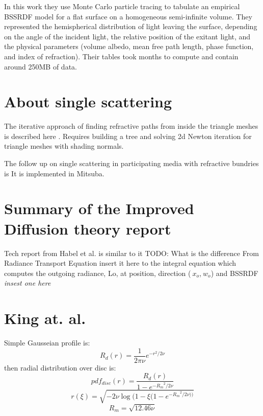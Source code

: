 In this work they use Monte Carlo particle tracing to tabulate an empirical
BSSRDF model for a flat surface on a homogeneous semi-infinite volume.
They represented the hemispherical distribution of light leaving the surface,
depending on the angle of the incident light, the relative position of the
exitant light, and the physical parameters (volume albedo, mean free path
length, phase function, and index of refraction). Their tables took months to
compute and contain around 250MB of data.

\section{About single scattering}
The iterative approach of finding refractive paths from inside the triangle
meshes is described here \cite{walter:inria-00388481}. Requires building a tree
and solving 2d Newton iteration for triangle meshes with shading normals.

The follow up on single scattering in participating media with refractive
bundries is \cite{holzschuch:hal-01083246} It is implemented in Mitsuba.

\section{Summary of the Improved Diffusion theory report}
Tech report from Habel et al. \cite{habel13cid} is similar to
it \cite{Habel:2013:PBD:2600890.2600896} TODO: What is the difference
From Radiance Transport Equation {insert it here} to the integral equation which
computes the outgoing radiance, Lo, at position, direction ($~x_o$,$~w_o$) and
BSSRDF \textit{insest one here}

\section{King at. al.}
Simple Gausseian profile is:
\[
R_d(r) = \dfrac{1}{2\pi \nu}e^{-r^2/2\nu}
\]
then radial distribution over disc is:
\[
pdf_{disc}(r) = \dfrac{R_d(r)}{1-e^{-{R_m}^2/2 \nu}}
\]
\[
r(\xi) = \sqrt{-2\nu \log(1-\xi(1-e^{-{R_m}^2/2 \nu))}}
\]
\[
R_m = \sqrt{12.46\nu}
\]


